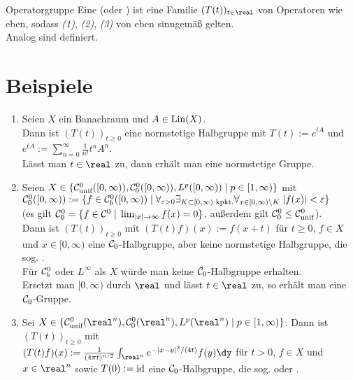 \begin{Def}{Operatorgruppe}
    Eine  (oder ) ist
    eine Familie $(T(t))_{t \in \real}$ von Operatoren wie eben,
    sodass \emph{(1)}, \emph{(2)}, \emph{(3)} von eben sinngemäß gelten.\\
    Analog sind  definiert.
\end{Def}

\pagebreak

\section{%
    Beispiele%
}

\begin{Bsp}
    \begin{enumerate}[label=\emph{(\alph*)}]
        \item
        Seien $X$ ein Banachraum und $A \in \operatorname{Lin}(X)$.\\
        Dann ist $(T(t))_{t \ge 0}$ eine normstetige Halbgruppe
        mit $T(t) := e^{tA}$ und $e^{tA} := \sum_{n=0}^\infty \frac{1}{n!} t^n A^n$.\\
        Lässt man $t \in \real$ zu, dann erhält man eine normstetige Gruppe.

        \item
        Seien $X \in \{\mathcal{C}^0_{\text{unif}}([0, \infty)), \mathcal{C}^0_0([0, \infty)), L^p([0,\infty)) \;|\;
        p \in [1, \infty)\}$ mit\\
        $\mathcal{C}^0_0([0, \infty)) := \{f \in \mathcal{C}^0_b([0, \infty)) \;|\; \forall_{\varepsilon>0}
        \exists_{K \subset [0, \infty) \text{ kpkt.}} \forall_{x \in [0, \infty) \setminus K}\;
        |f(x)| < \varepsilon\}$\\
        (es gilt $\mathcal{C}^0_0 = \{f \in \mathcal{C}^0 \;|\; \lim_{|x| \to \infty} f(x) = 0\}$,
        außerdem gilt $\mathcal{C}^0_0 \le \mathcal{C}^0_{\text{unif}}$).\\
        Dann ist $(T(t))_{t \ge 0}$ mit $(T(t) f)(x) := f(x + t)$
        für $t \ge 0$, $f \in X$ und $x \in [0, \infty)$
        eine $\mathcal{C}_0$-Halbgruppe, aber keine normstetige Halbgruppe,
        die sog. .\\
        Für $\mathcal{C}^0_b$ oder $L^\infty$ als $X$ würde man keine $\mathcal{C}_0$-Halbgruppe erhalten.\\
        Ersetzt man $[0, \infty)$ durch $\real$ und lässt $t \in \real$ zu,
        so erhält man eine $\mathcal{C}_0$-Gruppe.

        \item
        Sei $X \in \{\C^0_\unif(\real^n), \C^0_0(\real^n), L^p(\real^n) \;|\; p \in [1, \infty)\}$.
        Dann ist $(T(t))_{t \ge 0}$ mit\\
        $(T(t) f)(x) := \frac{1}{(4\pi t)^{n/2}} \int_{\real^n} e^{-|x-y|^2/(4t)} f(y)\dy$
        für $t > 0$, $f \in X$ und $x \in \real^n$ sowie $T(0) := \text{id}$
        eine $\mathcal{C}_0$-Halbgruppe, die sog.  oder
        .
    \end{enumerate}
\end{Bsp}

